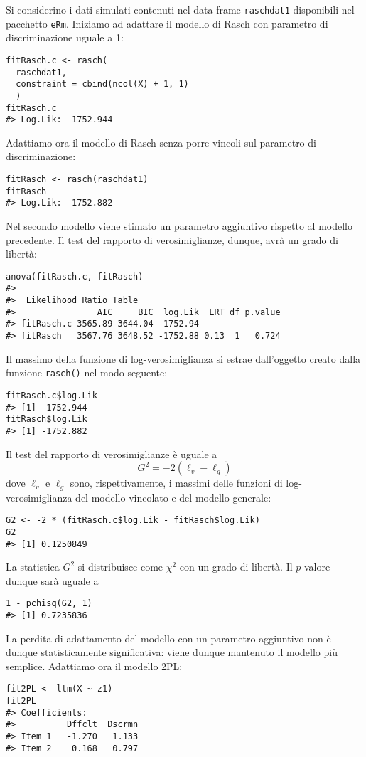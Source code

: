 \begin{exmp}
Si considerino i dati simulati contenuti nel data frame {\tt raschdat1} disponibili nel pacchetto {\tt eRm}.  Iniziamo ad adattare il modello di Rasch con parametro di discriminazione uguale a 1:
\begin{lstlisting}
fitRasch.c <- rasch(
  raschdat1, 
  constraint = cbind(ncol(X) + 1, 1)
  )
fitRasch.c
#> Log.Lik: -1752.944
\end{lstlisting}
Adattiamo ora il modello di Rasch senza porre vincoli sul parametro di discriminazione:
\begin{lstlisting}
fitRasch <- rasch(raschdat1)
fitRasch
#> Log.Lik: -1752.882
\end{lstlisting}
Nel secondo modello  viene stimato un parametro aggiuntivo rispetto al modello precedente.  Il test del rapporto di verosimiglianze, dunque, avrà un grado di libertà:
\begin{lstlisting}
anova(fitRasch.c, fitRasch)
#> 
#>  Likelihood Ratio Table
#>                AIC     BIC  log.Lik  LRT df p.value
#> fitRasch.c 3565.89 3644.04 -1752.94                
#> fitRasch   3567.76 3648.52 -1752.88 0.13  1   0.724
\end{lstlisting}
Il massimo della funzione di log-verosimiglianza si estrae dall'oggetto creato dalla funzione {\tt rasch()} nel modo seguente:
\begin{lstlisting}
fitRasch.c$log.Lik
#> [1] -1752.944
fitRasch$log.Lik
#> [1] -1752.882
\end{lstlisting}
Il test del rapporto di verosimiglianze è uguale a $$G^2=-2(\ell_v -\ell_g)$$ dove $\ell_v$ e $\ell_g$ sono, rispettivamente, i massimi delle funzioni di log-verosimiglianza del modello vincolato e del modello generale: 
\begin{lstlisting}
G2 <- -2 * (fitRasch.c$log.Lik - fitRasch$log.Lik)
G2
#> [1] 0.1250849
\end{lstlisting}
La statistica $G^2$ si distribuisce come $\chi^2$ con un grado di libertà. Il $p$-valore dunque sarà uguale a
\begin{lstlisting}
1 - pchisq(G2, 1)
#> [1] 0.7235836
\end{lstlisting}
La perdita di adattamento del modello con un parametro aggiuntivo non è dunque statisticamente significativa: viene dunque mantenuto il modello più semplice.
Adattiamo ora il modello 2PL:
\begin{lstlisting}
fit2PL <- ltm(X ~ z1)
fit2PL
#> Coefficients:
#>          Dffclt  Dscrmn
#> Item 1   -1.270   1.133
#> Item 2    0.168   0.797

\end{lstlisting}
\end{exmp}
